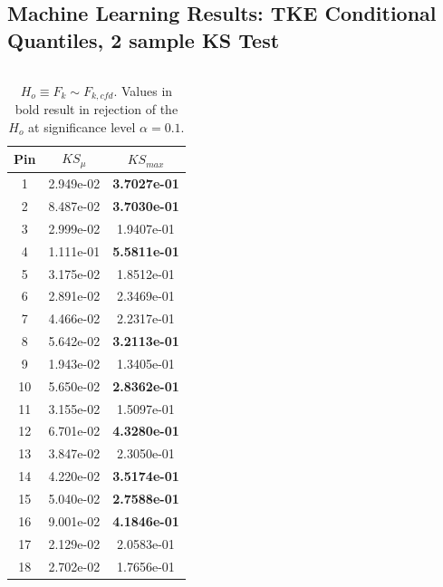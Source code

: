 \documentclass[t, pdftex]{beamer}
\begin{document}
\subsection*{Machine Learning Results: TKE Conditional Quantiles, 2 sample KS Test}
\begin{frame}
\vspace{-33pt}
\begin{columns}
    \begin{column}{0.5\textwidth}
\begin{table}[h]
    \tiny
    \begin{center}
        \caption[KS statistic TKE summary.]{$H_o\equiv \hat F_k \sim F_{k,cfd}$. Values in bold result in rejection of the $H_o$ at significance level $\alpha=0.1$.}
        \begin{tabular}[h]{|c|c|c|}
            \hline
            Pin & $KS_\mu$ & $KS_{max}$ \\
            \hline
            1 &  2.949e-02 &  \textbf{3.7027e-01} \\
            2 &  8.487e-02 &  \textbf{3.7030e-01} \\
            3 &  2.999e-02 &  1.9407e-01 \\
            4 &  1.111e-01 &  \textbf{5.5811e-01} \\
            5 &  3.175e-02 &  1.8512e-01 \\
            6 &  2.891e-02 &  2.3469e-01 \\
            7 &  4.466e-02 &  2.2317e-01 \\
            8 &  5.642e-02 &  \textbf{3.2113e-01} \\
            9 &  1.943e-02 &  1.3405e-01 \\
            10 & 5.650e-02 & \textbf{2.8362e-01} \\
            11 & 3.155e-02 & 1.5097e-01 \\
            12 & 6.701e-02 & \textbf{4.3280e-01} \\
            13 & 3.847e-02 & 2.3050e-01 \\
            14 & 4.220e-02 & \textbf{3.5174e-01} \\
            15 & 5.040e-02 & \textbf{2.7588e-01} \\
            16 & 9.001e-02 & \textbf{4.1846e-01} \\
            17 & 2.129e-02 & 2.0583e-01 \\
            18 & 2.702e-02 & 1.7656e-01 \\

\end{tabular}
\end{center}
\end{table}
\end{column}
\end{columns}
\end{frame}
\end{document}
